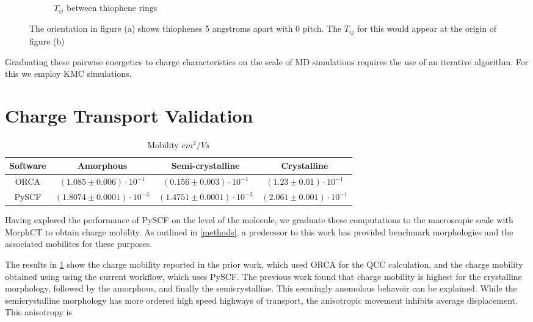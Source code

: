 \begin{figure}[]
\begin{subfigure}{.8\textwidth}
    \caption{$T_{ij}$ between thiophene rings}
\end{subfigure}
    \caption{The orientation in figure (a) shows thiophenes 5 angstroms apart with 0 pitch. The $T_{ij}$ for
    this would appear at the origin of figure (b)}
\label{TIplots}
\end{figure}

Graduating these pairwise energetics to charge characteristics on the scale of MD simulations
requires the use of an iterative algorithm. For this we employ KMC simulations.

\section{Charge Transport Validation}
\label{mobility}
\begin{table}[ht]
    \caption{Mobility $cm^{2}/Vs$} %
\centering %
\begin{tabular}{c c c c} %
\hline\hline %
Software & Amorphous & Semi-crystalline & Crystalline \\ [0.5ex] %
\hline %
    ORCA & $(1.085 \pm 0.006)\cdot 10^{-1}$ & $(0.156 \pm 0.003)\cdot 10^{-1}$ & $(1.23 \pm 0.01)\cdot 10^{-1}$ \\ %
PySCF & $(1.8074 \pm 0.0001)\cdot 10^{-3}$ & $(1.4751 \pm 0.0001)\cdot 10^{-3}$ & $(2.061 \pm 0.001)\cdot 10^{-1}$  \\ [1ex] %
\hline %
\end{tabular}
\label{table:nonlin} %
\end{table}

Having explored the performance of PySCF on the level of the molecule, we graduate these computations to the
macroscopic scale with MorphCT to obtain charge mobility. As outlined in \autoref{methods}, a predecssor to
this work has provided benchmark morphologies and the associated mobilites for these purposes. 

The results in \ref{table:nonlin} show the charge mobility reported in the prior work, which used ORCA for
the QCC calculation, and the charge mobility obtained using using the current workflow, which uses PySCF. 
The previous work found that charge mobility is highest for the crystalline morphology, followed by the
amorphous, and finally the semicrystalline. This seemingly anomolous behavoir can be explained. While the
semicrystalline morphology has more ordered high speed highways of transport, the anisotropic movement
inhibits average displacement. This anisotropy is


